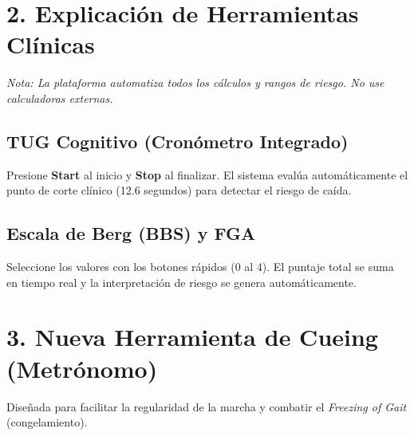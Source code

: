 \documentclass[12pt,a4paper]{article}
\begin{document}
\section{2. Explicación de Herramientas Clínicas}
\textit{Nota: La plataforma automatiza todos los cálculos y rangos de riesgo. No use calculadoras externas.}

\subsection*{TUG Cognitivo (Cronómetro Integrado)}
Presione \textbf{Start} al inicio y \textbf{Stop} al finalizar. El sistema evalúa automáticamente el punto de corte clínico (12.6 segundos) para detectar el riesgo de caída.

\subsection*{Escala de Berg (BBS) y FGA}
Seleccione los valores con los botones rápidos (0 al 4). El puntaje total se suma en tiempo real y la interpretación de riesgo se genera automáticamente.

\section{3. Nueva Herramienta de Cueing (Metrónomo)}
Diseñada para facilitar la regularidad de la marcha y combatir el \textit{Freezing of Gait} (congelamiento).

\vspace{0.5cm}
\begin{center}
\end{center}
\vspace{0.5cm}
\end{document}
